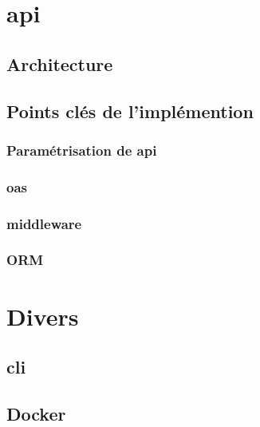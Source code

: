 \pagebreak
\section{\texorpdfstring{\Gls{api}}{API}}
\label{chapter:api}



\subsection{Architecture}

\subsection{Points clés de l'implémention}

\subsubsection*{Paramétrisation de \Gls{api}}
\subsubsection*{\Gls{oas}}
\subsubsection*{\Gls{middleware}}
\subsubsection*{ORM}


\section{Divers}
\subsection{\texorpdfstring{\Gls{cli}}{CLI}}
\subsection{Docker}


